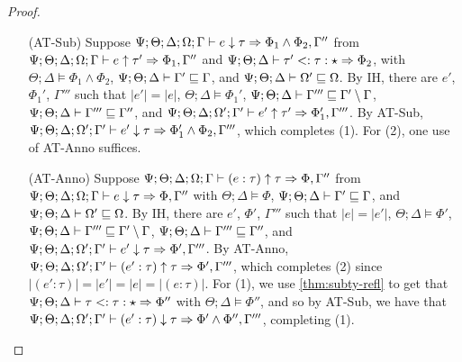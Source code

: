 \begin{proof}
\begin{itemize}
  \item[(AT-Sub)] Suppose $\Psi ; \Theta ; \Delta ; \Omega ; \Gamma \vdash e \downarrow \tau \Rightarrow \Phi_1 \wedge \Phi_2,\Gamma''$ from
  $\Psi ; \Theta ; \Delta ; \Omega ; \Gamma \vdash e \uparrow \tau' \Rightarrow \Phi_1,\Gamma''$ and
  $\Psi;\Theta;\Delta \vdash \tau' <: \tau : \star \Rightarrow \Phi_2$, with
  $\Theta ; \Delta \vDash \Phi_1 \wedge \Phi_2$,
  $\Psi ; \Theta ; \Delta \vdash \Gamma' \sqsubseteq \Gamma$, and
  $\Psi ; \Theta ; \Delta \vdash \Omega' \sqsubseteq \Omega$.
  By IH, there are $e'$, $\Phi_1'$, $\Gamma'''$ such that
  $|e'| = |e|$,
  $\Theta ; \Delta \vDash \Phi_1'$,
  $\Psi ; \Theta ; \Delta \vdash \Gamma''' \sqsubseteq \Gamma' \setminus \Gamma$,
  $\Psi ; \Theta ; \Delta \vdash \Gamma''' \sqsubseteq \Gamma''$, and
  $\Psi ; \Theta ; \Delta ; \Omega' ; \Gamma' \vdash e' \uparrow \tau' \Rightarrow \Phi_1', \Gamma'''$.
  By AT-Sub, $\Psi ; \Theta ; \Delta ; \Omega' ; \Gamma' \vdash e' \downarrow \tau \Rightarrow \Phi_1' \wedge \Phi_2,\Gamma'''$,
  which completes (1). For (2), one use of AT-Anno suffices.
  
  \item[(AT-Anno)] Suppose $\Psi ; \Theta ; \Delta ; \Omega ; \Gamma \vdash (e : \tau) \uparrow \tau \Rightarrow \Phi,\Gamma''$ from 
  $\Psi ; \Theta ; \Delta ; \Omega ; \Gamma \vdash e \downarrow \tau \Rightarrow \Phi,\Gamma''$ with
  $\Theta ; \Delta \vDash \Phi$,
  $\Psi ; \Theta ; \Delta \vdash \Gamma' \sqsubseteq \Gamma$, and
  $\Psi ; \Theta ; \Delta \vdash \Omega' \sqsubseteq \Omega$.
  By IH, there are $e'$, $\Phi'$, $\Gamma'''$ such that
  $|e| = |e'|$,
  $\Theta ; \Delta \vDash \Phi'$,
  $\Psi ; \Theta ; \Delta \vdash \Gamma''' \sqsubseteq \Gamma' \setminus \Gamma$,
  $\Psi ; \Theta ; \Delta \vdash \Gamma''' \sqsubseteq \Gamma''$, and
  $\Psi ; \Theta ; \Delta ; \Omega' ; \Gamma' \vdash e' \downarrow \tau \Rightarrow \Phi',\Gamma'''$.
  By AT-Anno, $\Psi ; \Theta ; \Delta ; \Omega' ; \Gamma' \vdash (e' : \tau) \uparrow \tau \Rightarrow \Phi',\Gamma'''$, which completes (2)
  since $|(e' : \tau)| = |e'| = |e| = |(e : \tau)|$. For (1), we use \autoref{thm:subty-refl} to get that $\Psi ; \Theta ; \Delta \vdash \tau <:  \tau : \star \Rightarrow \Phi''$ with $\Theta ; \Delta \vDash \Phi''$, and so by AT-Sub, we have that $\Psi ; \Theta ; \Delta ; \Omega' ; \Gamma' \vdash (e' : \tau) \downarrow \tau \Rightarrow \Phi' \wedge \Phi'',\Gamma'''$, completing (1).
 
  
  
\end{itemize}
\end{proof}